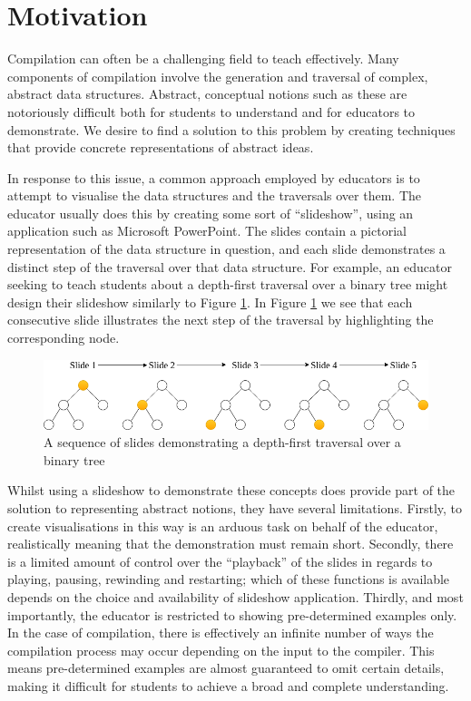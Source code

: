 \documentclass{l4proj}
\begin{document}
\section{Motivation}
Compilation can often be a challenging field to teach effectively. Many components of compilation involve the generation and traversal of complex, abstract data structures. Abstract, conceptual notions such as these are notoriously difficult both for students to understand and for educators to demonstrate. We desire to find a solution to this problem by creating techniques that provide concrete representations of abstract ideas.

In response to this issue, a common approach employed by educators is to attempt to visualise the data structures and the traversals over them. The educator usually does this by creating some sort of ``slideshow'', using an application such as Microsoft PowerPoint. The slides contain a pictorial representation of the data structure in question, and each slide demonstrates a distinct step of the traversal over that data structure. For example, an educator seeking to teach students about a depth-first traversal over a binary tree might design their slideshow similarly to Figure \ref{fig:slideshow}. In Figure \ref{fig:slideshow} we see that each consecutive slide illustrates the next step of the traversal by highlighting the corresponding node.

\begin{figure}
\centering
\includegraphics[scale=0.5]{images/slideshow.png}
\caption{A sequence of slides demonstrating a depth-first traversal over a binary tree}
\label{fig:slideshow}	
\end{figure}

Whilst using a slideshow to demonstrate these concepts does provide part of the solution to representing abstract notions, they have several limitations. Firstly, to create visualisations in this way is an arduous task on behalf of the educator, realistically meaning that the demonstration must remain short. Secondly, there is a limited amount of control over the “playback” of the slides in regards to playing, pausing, rewinding and restarting; which of these functions is available depends on the choice and availability of slideshow application. Thirdly, and most importantly, the educator is restricted to showing pre-determined examples only. In the case of compilation, there is effectively an infinite number of ways the compilation process may occur depending on the input to the compiler. This means pre-determined examples are almost guaranteed to omit certain details, making it difficult for students to achieve a broad and complete understanding.
\end{document}
